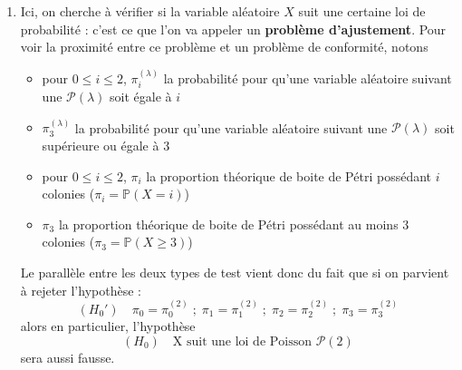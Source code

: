 \documentclass[a4paper,oneside,12pt]{article}
\theoremstyle{plain}
\def\P{{\mathbb P}}
\begin{document}
\begin{enumerate}
    \item Ici, on cherche à vérifier si la variable aléatoire $X$ suit une certaine loi de probabilité : c'est ce que l'on va appeler un \textbf{problème d'ajustement}. Pour voir la proximité entre ce problème et un problème de conformité, notons
    \begin{itemize}
        \item pour $ 0\le i \le 2$, $\pi_i^{(\lambda)}$ la probabilité pour qu'une variable aléatoire suivant une $\mathcal{P}(\lambda)$ soit égale à $i$
        \item $\pi_3^{(\lambda)}$ la probabilité pour qu'une variable aléatoire suivant une $\mathcal{P}(\lambda)$ soit supérieure ou égale à 3
        \item pour $ 0\le i \le 2$,
        $\pi_i$ la proportion théorique de boite de Pétri possédant $i$ colonies ($\pi_i = \P(X=i)$)
        \item $\pi_3$ la proportion théorique de boite de Pétri possédant au moins 3 colonies ($\pi_3 = \P(X\ge3)$)
    \end{itemize}

    Le parallèle entre les deux types de test vient donc du fait que si on parvient à rejeter l'hypothèse :
    $$(H_0') \quad \pi_{0} = \pi_0^{(2)} \;;\;\pi_{1} = \pi_1^{(2)} \;;\;\pi_{2} = \pi_2^{(2)} \;; \; \pi_{3} = \pi_3^{(2)}$$
    alors en particulier, l'hypothèse 
    $$(H_0) \quad \mbox{X suit une loi de Poisson }\mathcal{P}(2)$$
    sera aussi fausse.\\


\end{enumerate}
\end{document}
